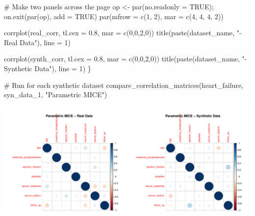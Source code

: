 \documentclass[
  letterpaper,
  DIV=11,
  numbers=noendperiod]{scrartcl}
\newenvironment{Shaded}{\begin{snugshade}}{\end{snugshade}}
\newcommand{\AttributeTok}[1]{\textcolor[rgb]{0.40,0.45,0.13}{#1}}
\newcommand{\CommentTok}[1]{\textcolor[rgb]{0.37,0.37,0.37}{#1}}
\newcommand{\ConstantTok}[1]{\textcolor[rgb]{0.56,0.35,0.01}{#1}}
\newcommand{\DecValTok}[1]{\textcolor[rgb]{0.68,0.00,0.00}{#1}}
\newcommand{\FloatTok}[1]{\textcolor[rgb]{0.68,0.00,0.00}{#1}}
\newcommand{\FunctionTok}[1]{\textcolor[rgb]{0.28,0.35,0.67}{#1}}
\newcommand{\NormalTok}[1]{\textcolor[rgb]{0.00,0.23,0.31}{#1}}
\newcommand{\OtherTok}[1]{\textcolor[rgb]{0.00,0.23,0.31}{#1}}
\newcommand{\StringTok}[1]{\textcolor[rgb]{0.13,0.47,0.30}{#1}}
\begin{document}
\begin{Shaded}
\begin{Highlighting}[]
  \CommentTok{\# Make two panels across the page}
\NormalTok{  op }\OtherTok{\textless{}{-}} \FunctionTok{par}\NormalTok{(}\AttributeTok{no.readonly =} \ConstantTok{TRUE}\NormalTok{); }\FunctionTok{on.exit}\NormalTok{(}\FunctionTok{par}\NormalTok{(op), }\AttributeTok{add =} \ConstantTok{TRUE}\NormalTok{)}
  \FunctionTok{par}\NormalTok{(}\AttributeTok{mfrow =} \FunctionTok{c}\NormalTok{(}\DecValTok{1}\NormalTok{, }\DecValTok{2}\NormalTok{), }\AttributeTok{mar =} \FunctionTok{c}\NormalTok{(}\DecValTok{4}\NormalTok{, }\DecValTok{4}\NormalTok{, }\DecValTok{4}\NormalTok{, }\DecValTok{2}\NormalTok{))}

  \FunctionTok{corrplot}\NormalTok{(real\_corr,  }\AttributeTok{tl.cex =} \FloatTok{0.8}\NormalTok{, }\AttributeTok{mar =} \FunctionTok{c}\NormalTok{(}\DecValTok{0}\NormalTok{,}\DecValTok{0}\NormalTok{,}\DecValTok{2}\NormalTok{,}\DecValTok{0}\NormalTok{))}
  \FunctionTok{title}\NormalTok{(}\FunctionTok{paste}\NormalTok{(dataset\_name, }\StringTok{"{-} Real Data"}\NormalTok{), }\AttributeTok{line =} \DecValTok{1}\NormalTok{)}

  \FunctionTok{corrplot}\NormalTok{(synth\_corr, }\AttributeTok{tl.cex =} \FloatTok{0.8}\NormalTok{, }\AttributeTok{mar =} \FunctionTok{c}\NormalTok{(}\DecValTok{0}\NormalTok{,}\DecValTok{0}\NormalTok{,}\DecValTok{2}\NormalTok{,}\DecValTok{0}\NormalTok{))}
  \FunctionTok{title}\NormalTok{(}\FunctionTok{paste}\NormalTok{(dataset\_name, }\StringTok{"{-} Synthetic Data"}\NormalTok{), }\AttributeTok{line =} \DecValTok{1}\NormalTok{)}
\NormalTok{\}}

\CommentTok{\# Run for each synthetic dataset}
\FunctionTok{compare\_correlation\_matrices}\NormalTok{(heart\_failure, syn\_data\_1, }\StringTok{"Parametric MICE"}\NormalTok{)}
\end{Highlighting}
\end{Shaded}

\begin{center}
\includegraphics[width=1\linewidth,height=\textheight,keepaspectratio]{heart_failure_synthetic_data_project_files/figure-pdf/Correlation Matrices Comparison using Corrplot-1.pdf}
\end{center}
\end{document}
